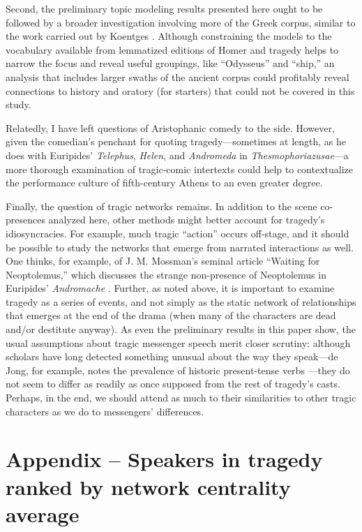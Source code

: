 \documentclass{jcls}
\begin{document}
Second, the preliminary topic modeling results presented here ought
to be followed by a broader investigation involving more of the Greek
corpus, similar to the work carried out by Koentges
\cite{Koentges2020}. Although constraining the models to the
vocabulary available from lemmatized editions of Homer and tragedy
helps to narrow the focus and reveal useful groupings, like
``Odysseus'' and ``ship,'' an analysis that includes larger swaths of
the ancient corpus could profitably reveal connections to history and
oratory (for starters) that could not be covered in this study.

Relatedly, I have left questions of Aristophanic comedy to the side.
However, given the comedian's penchant for quoting
tragedy---sometimes at length, as he does with Euripides'
\textit{Telephus}, \textit{Helen}, and \textit{Andromeda} in
\textit{Thesmophoriazusae}---a more thorough examination of
tragic-comic intertexts could help to contextualize the performance
culture of fifth-century Athens to an even greater degree.

Finally, the question of tragic networks remains. In addition to the
scene co-presences analyzed here, other methods might
better account for tragedy's idiosyncracies. For
example, much tragic ``action'' occurs off-stage, and it should be
possible to study the networks that emerge from narrated interactions
as well. One thinks, for example, of J. M. Mossman's seminal article
``Waiting for Neoptolemus,'' which discusses the strange non-presence
of Neoptolemus in Euripides' \textit{Andromache} \cite{Mossman1996}. Further, as noted
above, it is important to examine tragedy as a series of events, and
not simply as the static network of relationships that emerges at the
end of the drama (when many of the characters are dead and/or destitute anyway).
As even the preliminary results in this paper show, the usual assumptions
about tragic messenger speech merit closer scrutiny: although scholars have
long detected something unusual about the way they speak---de Jong, for
example, notes the prevalence of historic present-tense verbs
\cite{deJong1991}---they do not seem to differ as readily as once supposed
from the rest of tragedy's casts. Perhaps, in the end, we should attend
as much to their similarities to other tragic characters as we do to
messengers' differences.

\section{Appendix – Speakers in tragedy ranked by network centrality average}
\label{sec:appendix}
\end{document}
